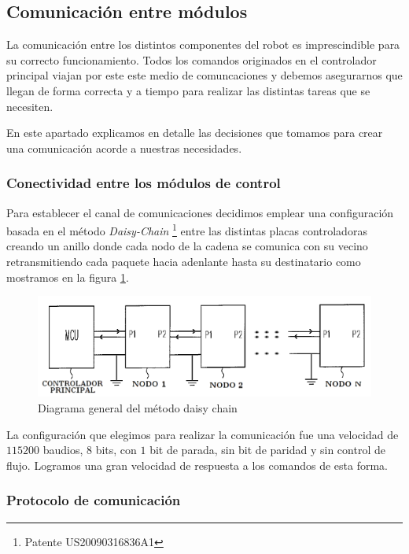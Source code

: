 \subsection{Comunicaci\'on entre m\'odulos}
\label{Hcomm}

La comunicaci\'on entre los distintos componentes del robot es imprescindible para su correcto funcionamiento. Todos los comandos
originados en el controlador principal viajan por este este medio de comuncaciones y debemos asegurarnos que llegan de forma correcta
y a tiempo para realizar las distintas tareas que se necesiten.

En este apartado explicamos en detalle las decisiones que tomamos para crear una comunicaci\'on acorde a nuestras necesidades.

\subsubsection{Conectividad entre los m\'odulos de control}
\label{HCconectividad}

Para establecer el canal de comunicaciones decidimos emplear una configuraci\'on basada en el m\'etodo \emph{Daisy-Chain}
\footnote{Patente US20090316836A1} entre las distintas placas controladoras creando un anillo donde cada nodo de la cadena se
comunica con su vecino retransmitiendo cada paquete hacia adenlante hasta su destinatario como mostramos en la figura
\ref{daisychain_diagram}.

\begin{figure}[ht]
	\centering
	\includegraphics[scale=.40]{daisychain_diagram.png}
	\caption{Diagrama general del m\'etodo daisy chain}
	\label{daisychain_diagram}
\end{figure}

La configuraci\'on que elegimos para realizar la comunicaci\'on fue una velocidad de $115200$ baudios, $8$ bits, con $1$ bit de parada,
sin bit de paridad y sin control de flujo. Logramos una gran velocidad de respuesta a los comandos de esta forma.

\subsubsection{Protocolo de comunicaci\'on}
\label{HCprotocolo}

